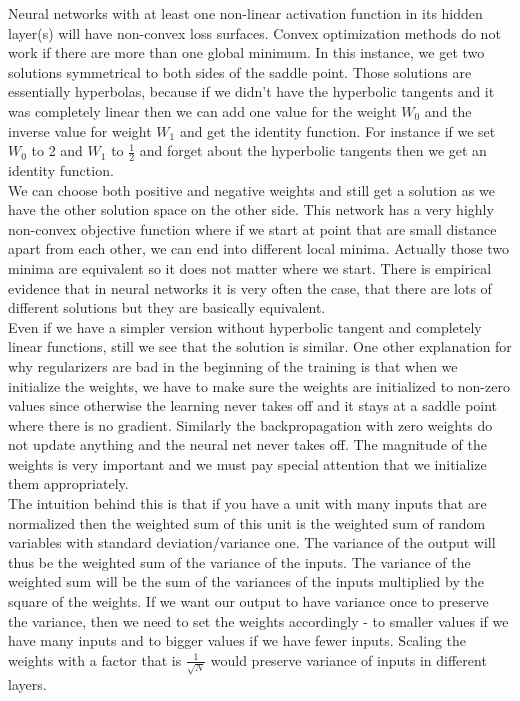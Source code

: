 Neural networks with at least one non-linear activation function in its hidden layer(s) will have non-convex loss surfaces. 
Convex optimization methods do not work if there are more than one global minimum. 
In this instance, we get two solutions symmetrical to both sides of the saddle point. 
Those solutions are essentially hyperbolas, because if we didn't have the hyperbolic tangents and it was completely linear then we can add one value for the weight $W_0$ and the inverse value for weight $W_1$ and get the identity function. 
For instance if we set $W_0$ to 2 and $W_1$ to $\frac{1}{2}$ and forget about the hyperbolic tangents then we get an identity function.\\

We can choose both positive and negative weights and still get a solution as we have the other solution space on the other side. 
This network has a very highly non-convex objective function where if we start at point that are small distance apart from each other, we can end into different local minima. 
Actually those two minima are equivalent so it does not matter where we start. 
There is empirical evidence that in neural networks it is very often the case, that there are lots of different solutions but they are basically equivalent. \\

Even if we have a simpler version without hyperbolic tangent and completely linear functions, still we see that the solution is similar. 
One other explanation for why regularizers are bad in the beginning of the training is that when we initialize the weights, we have to make sure the weights are initialized to non-zero values since otherwise the learning never takes off and it stays at a saddle point where there is no gradient.
Similarly the backpropagation with zero weights do not update anything and the neural net never takes off. 
The magnitude of the weights is very important and we must pay special attention that we initialize them appropriately.\\

The intuition behind this is that if you have a unit with many inputs that are normalized then the weighted sum of this unit is the weighted sum of random variables with standard deviation/variance one.
The variance of the output will thus be the weighted sum of the variance of the inputs. 
The variance of the weighted sum will be the sum of the variances of the inputs multiplied by the square of the weights. 
If we want our output to have variance once to preserve the variance, then we need to set the weights accordingly - to smaller values if we have many inputs and to bigger values if we have fewer inputs.
Scaling the weights with a factor that is $\frac{1}{\sqrt{N}}$ would preserve variance of inputs in different layers. 
